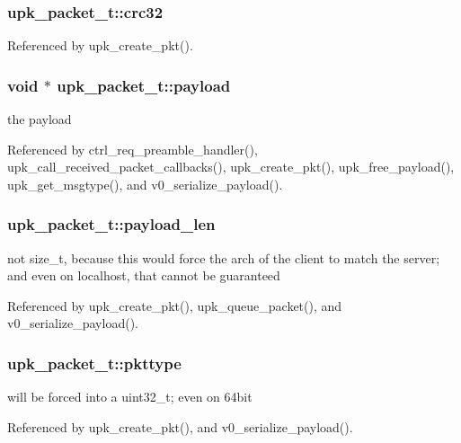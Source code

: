 \subsubsection[{crc32}]{ {\bf upk\_\-packet\_\-t::crc32}}\label{structupk__packet__t_a440fa8d8947e7f5c17997d51f12d4cee}


Referenced by upk\_\-create\_\-pkt().

\subsubsection[{payload}]{\setlength{\rightskip}{0pt plus 5cm}void $\ast$ {\bf upk\_\-packet\_\-t::payload}}\label{structupk__packet__t_a37753733200c7b887d8616f7528e15a6}
the payload 

Referenced by ctrl\_\-req\_\-preamble\_\-handler(), upk\_\-call\_\-received\_\-packet\_\-callbacks(), upk\_\-create\_\-pkt(), upk\_\-free\_\-payload(), upk\_\-get\_\-msgtype(), and v0\_\-serialize\_\-payload().

\subsubsection[{payload\_\-len}]{ {\bf upk\_\-packet\_\-t::payload\_\-len}}\label{structupk__packet__t_a4763ca6853e27fe3eb7e2b3ec45deeb5}
not size\_\-t, because this would force the arch of the client to match the server; and even on localhost, that cannot be guaranteed 

Referenced by upk\_\-create\_\-pkt(), upk\_\-queue\_\-packet(), and v0\_\-serialize\_\-payload().

\subsubsection[{pkttype}]{ {\bf upk\_\-packet\_\-t::pkttype}}\label{structupk__packet__t_a90897befc1fe65ebb2c18748a5881d83}
will be forced into a uint32\_\-t; even on 64bit 

Referenced by upk\_\-create\_\-pkt(), and v0\_\-serialize\_\-payload().

